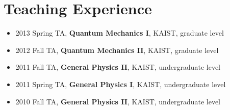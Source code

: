 \section{Teaching Experience}\label{teaching-experience}

\begin{itemize}
\tightlist
\item
  2013 Spring TA, \textbf{Quantum Mechanics I}, KAIST, graduate level
\item
  2012 Fall TA, \textbf{Quantum Mechanics II}, KAIST, graduate level
\item
  2011 Fall TA, \textbf{General Physics II}, KAIST, undergraduate level
\item
  2011 Spring TA, \textbf{General Physics I}, KAIST, undergraduate level
\item
  2010 Fall TA, \textbf{General Physics II}, KAIST, undergraduate level
\end{itemize}
